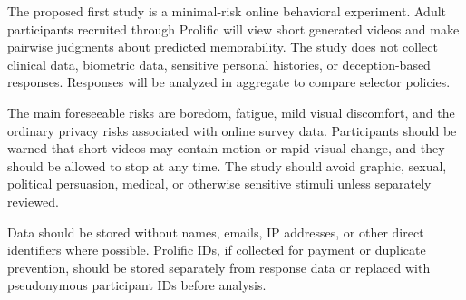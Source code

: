 The proposed first study is a minimal-risk online behavioral experiment. Adult
participants recruited through Prolific will view short generated videos and
make pairwise judgments about predicted memorability. The study does not collect
clinical data, biometric data, sensitive personal histories, or deception-based
responses. Responses will be analyzed in aggregate to compare selector policies.

The main foreseeable risks are boredom, fatigue, mild visual discomfort, and the
ordinary privacy risks associated with online survey data. Participants should be
warned that short videos may contain motion or rapid visual change, and they
should be allowed to stop at any time. The study should avoid graphic, sexual,
political persuasion, medical, or otherwise sensitive stimuli unless separately
reviewed.

Data should be stored without names, emails, IP addresses, or other direct
identifiers where possible. Prolific IDs, if collected for payment or duplicate
prevention, should be stored separately from response data or replaced with
pseudonymous participant IDs before analysis.
